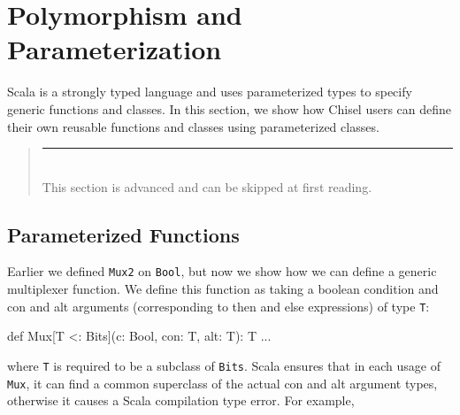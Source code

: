 \documentclass[twocolumn,10pt]{article}
\newenvironment{commentary}
{ \vspace{-0.1in}
  \begin{quotation}
  \noindent
  \small \em
  \rule{\linewidth}{1pt}\\
}
{
  \end{quotation}
}
\def\code#1{{\tt #1}}
\begin{document}


%
%




\section{Polymorphism and Parameterization}
\label{sec:parameterization}

Scala is a strongly typed language and uses parameterized types to specify generic functions and classes.  
In this section, we show how Chisel users can define their own reusable functions and classes using parameterized classes.
\begin{commentary}
This section is advanced and can be skipped at first reading.
\end{commentary}

\subsection{Parameterized Functions}

Earlier we defined \code{Mux2} on \code{Bool}, but now we show how we can define a generic multiplexer function.
We define this function as taking a boolean condition and con and alt arguments (corresponding to then and else expressions) of type \code{T}:

\begin{scala}
def Mux[T <: Bits](c: Bool, con: T, alt: T): T { ... }
\end{scala}

\noindent
where \code{T} is required to be a subclass of \code{Bits}.
Scala ensures that in each usage of \code{Mux}, it can find a common superclass of the actual con and alt argument types, 
otherwise it causes a Scala compilation type error.
For example,
\end{document}
